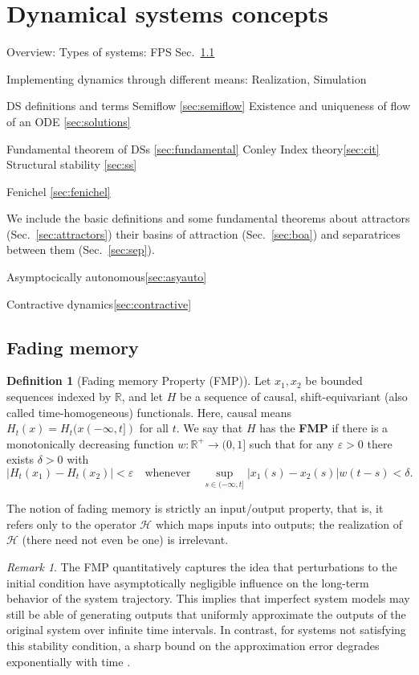 \documentclass{article}
\theoremstyle{definition} \newtheorem{definition}{Definition}
\theoremstyle{remark} \newtheorem{remark}{Remark}
\newcounter{ct}
\begin{document}
\newpage
\section{Dynamical systems concepts}
Overview: 
Types of systems: FPS Sec.~\ref{sec:fading_memory}

Implementing dynamics through different means: Realization\label{sec:realization}, Simulation\label{sec:simulation}

DS definitions and terms 
Semiflow \ref{sec:semiflow}
Existence and uniqueness of flow of an ODE \ref{sec:solutions}

Fundamental theorem of DSs \ref{sec:fundamental}
Conley Index theory\ref{sec:cit}
Structural stability \ref{sec:ss}

Fenichel \ref{sec:fenichel}

We include the basic definitions and some fundamental theorems about attractors (Sec.~\ref{sec:attractors})
their basins of attraction (Sec.~\ref{sec:boa}) and separatrices between them (Sec.~\ref{sec:sep}).

Asymptocically autonomous\ref{sec:asyauto}

Contractive dynamics\ref{sec:contractive}



\subsection{Fading memory}\label{sec:fading_memory}

\begin{definition}[Fading memory Property (FMP)]\label{def:fmp}
Let $x_1, x_2$ be bounded sequences indexed by $\mathbb{R}$, and let $H$ be a sequence of causal, shift-equivariant (also called time-homogeneous) functionals.
Here, causal means $H_t(x) = H_t(x(-\infty,t])$ for all $t$.
We say that $H$ has the \textbf{FMP} if there is a monotonically decreasing function $w : \mathbb{R}^+ \to (0, 1]$ such that for any $\varepsilon > 0$ there exists $\delta > 0$ with 
\[
|H_t(x_1) - H_t(x_2)| < \varepsilon \quad \text{whenever} \quad \sup_{s \in (-\infty, t]} |x_1(s) - x_2(s)| w(t - s) < \delta.
\]
\end{definition}
The notion of fading memory is strictly an input/output property, that is, it refers only to the operator $\mathcal{H}$ which maps inputs into outputs; the realization of $\mathcal{H}$ (there need not even be one) is irrelevant.

\begin{remark}\label{rem:fmp}%
The FMP quantitatively captures the idea that perturbations to the initial condition have asymptotically negligible influence on the long-term behavior of the system trajectory.
This implies that imperfect system models may still be able of generating outputs that uniformly approximate the outputs of the original system over infinite time intervals.
In contrast, for systems not satisfying this stability condition, a sharp bound on the approximation error degrades exponentially with time \citep{hirsch1974nonautonomous, sontag2013mathematical}.
\end{remark}
\end{document}
